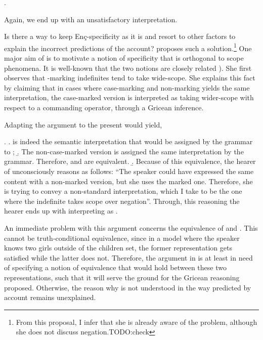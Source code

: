 \documentclass[11pt,a4paper]{article}
\newcommand{\encspec}{Enç-specific}
\begin{document}
\ex.\label{Exencwide}

Again, we end up with an unsatisfactory interpretation.

Is there a way to keep \encspec ity as it is and resort to other factors to explain the incorrect predictions of the account?  proposes such a solution.\footnote{From this proposal, I infer that she is already aware of the problem, although she does not discuss negation.TODO:check} One major aim of  is to motivate a notion of specificity that is orthogonal to scope phenomena. It is well-known that the two notions are closely related ). She first observes that \acc-marking indefinites tend to take wide-scope. She explains this fact by claiming that in cases where case-marking and non-marking yields the same interpretation, the case-marked version is interpreted as taking wider-scope with respect to a commanding operator, through a Gricean inference.

Adapting the argument to the present would yield,

\ex.\label{encgrice}
\a.  is indeed the semantic interpretation that would be assigned by the grammar to ;
\b. The non-case-marked version is assigned the same interpretation by the grammar. Therefore,   and  are equivalent.
\b. Because of this equivalence, the hearer of  unconsciously reasons as follows: ``The speaker could have expressed the same content with a non-marked version, but she uses the marked one. Therefore, she is trying to convey a non-standard interpretation, which I take to be the one where the indefinite takes scope over negation''. Through, this reasoning the hearer ends up with interpreting  as .


An immediate problem with this argument concerns the equivalence of  and . This cannot be truth-conditional equivalence, since in a model where the speaker knows two girls outside of the children set, the former representation gets satisfied while the latter does not. Therefore, the argument in  is at least in need of specifying a notion of equivalence that would hold between these two representations, such that it will serve the ground for the Gricean reasoning proposed. Otherwise, the reason why  is not understood in the way predicted by  account remains unexplained.
\end{document}
